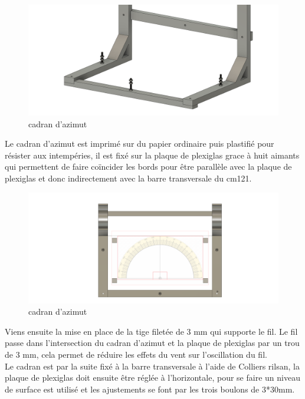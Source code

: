 \documentclass[12pt,a4paper]{article}
\begin{document}
\begin{flushleft}
\begin{figure}[H]
\centering
\includegraphics[width=12cm]{image/montage/boussole_solaire/6.png} 
\caption{cadran d'azimut}
\end{figure}

Le cadran d'azimut est imprimé sur du papier ordinaire puis plastifié pour résister aux intempéries, il est fixé sur la plaque de plexiglas grace à huit aimants qui permettent de faire coïncider les bords pour être parallèle avec la plaque de plexiglas et donc indirectement avec la barre transversale du cm121.\\

\begin{figure}[H]
\centering
\includegraphics[width=12cm]{image/montage/boussole_solaire/5.png} 
\caption{cadran d'azimut}
\end{figure}


Viens ensuite la mise en place de la tige filetée de 3 mm qui supporte le fil. Le fil passe dans l'intersection du cadran d'azimut et la plaque de plexiglas par un trou de 3 mm, cela permet de réduire les effets du vent sur l'oscillation du fil.\\
Le cadran est par la suite fixé à la barre transversale à l'aide de Colliers rilsan, la plaque de plexiglas doit ensuite être réglée à l'horizontale, pour se faire un niveau de surface est utilisé et les ajustements se font par les trois boulons de 3*30mm.


\end{flushleft}
\end{document}

